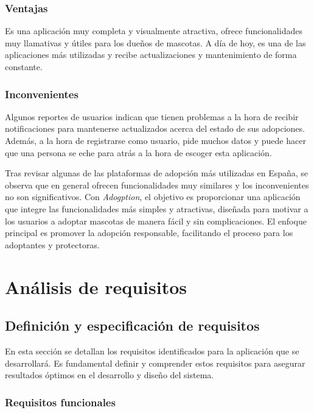 \documentclass[a4paper, 12pt]{article}
\begin{document}
\subsubsection*{Ventajas}

Es una aplicación muy completa y visualmente atractiva, ofrece funcionalidades muy llamativas y útiles para los dueños de mascotas. A día de hoy, es una de las aplicaciones más utilizadas y recibe actualizaciones y mantenimiento de forma constante.

\subsubsection*{Inconvenientes}

Algunos reportes de usuarios indican que tienen problemas a la hora de recibir notificaciones para mantenerse actualizados acerca del estado de sus adopciones. Además, a la hora de registrarse como usuario, pide muchos datos y puede hacer que una persona se eche para atrás a la hora de escoger esta aplicación. 



Tras revisar algunas de las plataformas de adopción más utilizadas en España, se observa que en general ofrecen funcionalidades muy similares y los inconvenientes no son significativos. Con \textit{Adogption}, el objetivo es proporcionar una aplicación que integre las funcionalidades más simples y atractivas, diseñada para motivar a los usuarios a adoptar mascotas de manera fácil y sin complicaciones. El enfoque principal es promover la adopción responsable, facilitando el proceso para los adoptantes y protectoras.


\newpage
\section{Análisis de requisitos}

\subsection{Definición y especificación de requisitos}

En esta sección se detallan los requisitos identificados para la aplicación que se desarrollará. Es fundamental definir y comprender estos requisitos para asegurar resultados óptimos en el desarrollo y diseño del sistema.

\subsubsection{Requisitos funcionales}
\end{document}

